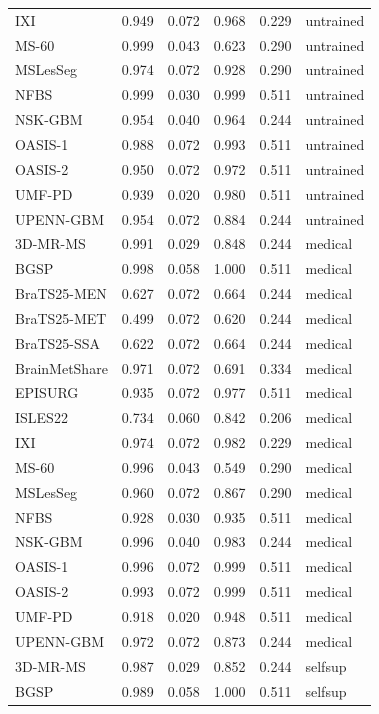 \begin{tabular}{lrrrrl}
IXI & 0.949 & 0.072 & 0.968 & 0.229 & untrained \\
MS-60 & 0.999 & 0.043 & 0.623 & 0.290 & untrained \\
MSLesSeg & 0.974 & 0.072 & 0.928 & 0.290 & untrained \\
NFBS & 0.999 & 0.030 & 0.999 & 0.511 & untrained \\
NSK-GBM & 0.954 & 0.040 & 0.964 & 0.244 & untrained \\
OASIS-1 & 0.988 & 0.072 & 0.993 & 0.511 & untrained \\
OASIS-2 & 0.950 & 0.072 & 0.972 & 0.511 & untrained \\
UMF-PD & 0.939 & 0.020 & 0.980 & 0.511 & untrained \\
UPENN-GBM & 0.954 & 0.072 & 0.884 & 0.244 & untrained \\
3D-MR-MS & 0.991 & 0.029 & 0.848 & 0.244 & medical \\
BGSP & 0.998 & 0.058 & 1.000 & 0.511 & medical \\
BraTS25-MEN & 0.627 & 0.072 & 0.664 & 0.244 & medical \\
BraTS25-MET & 0.499 & 0.072 & 0.620 & 0.244 & medical \\
BraTS25-SSA & 0.622 & 0.072 & 0.664 & 0.244 & medical \\
BrainMetShare & 0.971 & 0.072 & 0.691 & 0.334 & medical \\
EPISURG & 0.935 & 0.072 & 0.977 & 0.511 & medical \\
ISLES22 & 0.734 & 0.060 & 0.842 & 0.206 & medical \\
IXI & 0.974 & 0.072 & 0.982 & 0.229 & medical \\
MS-60 & 0.996 & 0.043 & 0.549 & 0.290 & medical \\
MSLesSeg & 0.960 & 0.072 & 0.867 & 0.290 & medical \\
NFBS & 0.928 & 0.030 & 0.935 & 0.511 & medical \\
NSK-GBM & 0.996 & 0.040 & 0.983 & 0.244 & medical \\
OASIS-1 & 0.996 & 0.072 & 0.999 & 0.511 & medical \\
OASIS-2 & 0.993 & 0.072 & 0.999 & 0.511 & medical \\
UMF-PD & 0.918 & 0.020 & 0.948 & 0.511 & medical \\
UPENN-GBM & 0.972 & 0.072 & 0.873 & 0.244 & medical \\
3D-MR-MS & 0.987 & 0.029 & 0.852 & 0.244 & selfsup \\
BGSP & 0.989 & 0.058 & 1.000 & 0.511 & selfsup \\

\end{tabular}
